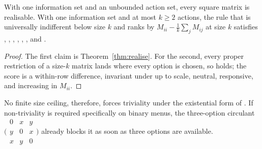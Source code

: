 \begin{proposition}\label{prop:ceiling}
With one information set and an unbounded action set, every square matrix is realisable. With one
information set and at most $k\ge2$ actions, the rule that is universally indifferent below size $k$
and ranks by $M_{ii}-\frac1k\sum_jM_{ij}$ at size $k$ satisfies , , , , ,
, and \Mon.
\end{proposition}

\begin{proof}
The first claim is Theorem~\ref{thm:realise}. For the second, every proper restriction of a
size-$k$ matrix lands where every option is chosen, so  holds; the score is a within-row
difference, invariant under  up to scale, neutral, responsive, and increasing in $M_{ii}$.
\end{proof}

No finite size ceiling, therefore, forces triviality under the existential form of . If
non-triviality is required specifically on binary menus, the three-option circulant
$\bigl(\begin{smallmatrix}0&x&y\\y&0&x\\x&y&0\end{smallmatrix}\bigr)$ already blocks it as soon as
three options are available.
